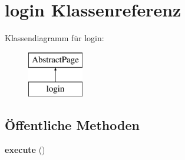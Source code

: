 \hypertarget{classlogin}{}\section{login Klassenreferenz}
\label{classlogin}
Klassendiagramm für login\+:\begin{figure}[H]
\begin{center}
\leavevmode
\includegraphics[height=2.000000cm]{classlogin}
\end{center}
\end{figure}
\subsection*{Öffentliche Methoden}
\begin{DoxyCompactItemize}
\item 
\mbox{\label{classlogin_a50ce566ed051d8c3748992037128db70}} 
{\bfseries execute} ()
\end{DoxyCompactItemize}
